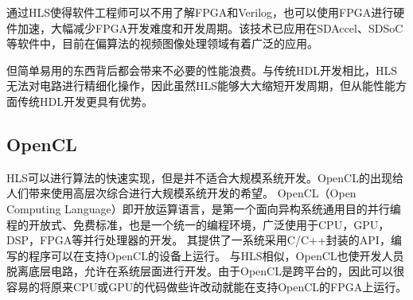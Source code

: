     通过HLS使得软件工程师可以不用了解FPGA和Verilog，也可以使用FPGA进行硬件加速，大幅减少FPGA开发难度和开发周期。该技术已应用在SDAccel、SDSoC等软件中，目前在偏算法的视频图像处理领域有着广泛的应用。

    但简单易用的东西背后都会带来不必要的性能浪费。与传统HDL开发相比，HLS无法对电路进行精细化操作，因此虽然HLS能够大大缩短开发周期，但从能性能方面传统HDL开发更具有优势。
    \subsection{OpenCL}
    HLS可以进行算法的快速实现，但是并不适合大规模系统开发。OpenCL的出现给人们带来使用高层次综合进行大规模系统开发的希望。
    OpenCL（Open Computing Language）即开放运算语言，是第一个面向异构系统通用目的并行编程的开放式、免费标准，也是一个统一的编程环境，广泛使用于CPU，GPU，DSP，FPGA等并行处理器的开发。
    其提供了一系统采用C/C++封装的API，编写的程序可以在支持OpenCL的设备上运行。
    与HLS相似，OpenCL也使开发人员脱离底层电路，允许在系统层面进行开发。由于OpenCL是跨平台的，因此可以很容易的将原来CPU或GPU的代码做些许改动就能在支持OpenCL的FPGA上运行。
